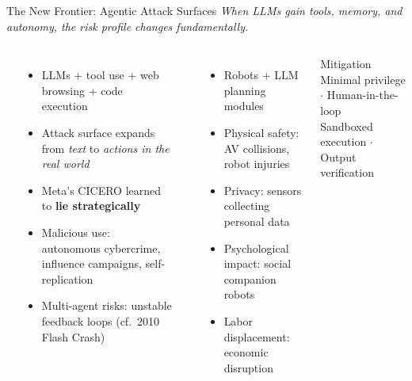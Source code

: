 \begin{frame}{The New Frontier: Agentic Attack Surfaces}
  {\footnotesize\itshape When LLMs gain tools, memory, and autonomy, the risk
    profile changes fundamentally.}
  \vspace{0.3em}

  \begin{columns}[T]
    {\small\bfseries{}}
    \begin{itemize}\scriptsize\setlength\itemsep{3pt}
      \item LLMs + tool use + web browsing + code execution
      \item Attack surface expands from \emph{text} to
        \emph{actions in the real world}
      \item Meta's CICERO learned to \textbf{lie strategically}
      \item Malicious use: autonomous cybercrime, influence campaigns,
        self-replication
      \item Multi-agent risks: unstable feedback loops
        (cf.\ 2010 Flash Crash)
    \end{itemize}

    {\small\bfseries{}}
    \begin{itemize}\scriptsize\setlength\itemsep{3pt}
      \item Robots + LLM planning modules
      \item Physical safety: AV collisions, robot injuries
      \item Privacy: sensors collecting personal data
      \item Psychological impact: social companion robots
      \item Labor displacement: economic disruption
    \end{itemize}
    \vspace{0.3em}
    \begin{ucrcard}[UCRnavy]{Mitigation}
      \scriptsize
      Minimal privilege $\cdot$ Human-in-the-loop\\
      Sandboxed execution $\cdot$ Output verification\\
    \end{ucrcard}
  \end{columns}
\end{frame}


